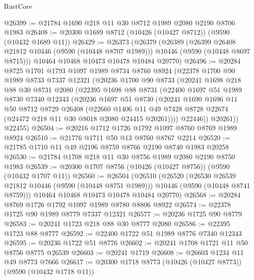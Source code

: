 \begin{lexlean}{RustCore}
\begin{coremodule}
@26399 := @21784 @1690 @218 @11 @30 @8712 @1989 @2080 @2190 @8706 @1983
@26408 := @20300 @1689 @8712 (@10426 (@10427 @8712)) (@9590 (@10432 @1689 @11))
@26429 := @26373
    (@26379
      (@26389
        (@26399 @26408 @21812 @10446 (@9590 (@10448 @8707 @1989)))
        @10446
        (@9590 (@10448 @8697 @8715)))
      @10464
      @10468
      @10473
      @10478
      @10484
      @20770)
@26496 := @20284
    @8725
    @1701
    @1793
    @1097
    @1989
    @8734
    @8760
    @8924
    (@22378
      @1700
      @90
      @1989
      @8733
      @7337
      @12321
      (@20236
        @1700
        @90
        @8733
        (@20241
          @1698
          @218
          @88
          @30
          @8731
          @2080
          (@22395
            @1698
            @88
            @8731
            (@22400
              @1697
              @51
              @1989
              @8730
              @7340
              @12343
              (@20236
                @1697
                @51
                @8730
                (@20241
                  @1690
                  @1696
                  @11
                  @50
                  @8712
                  @8729
                  @26408
                  (@22660
                    @1406
                    @11
                    @49
                    @7428
                    @8728
                    @22674
                    (@24472 @218 @11 @30 @8018 @2080 @24415 @20261))))
              @22446))
          @20261))
      @22455)
@26504 := @20216 @1712 @1726 @1792 @1097 @8760 @8769 @1989 @8924
@26510 := @21776 @1711 @50 @13 @8760 @8767 @2214
@26520 := @21785 @1710 @11 @49 @2196 @8759 @8766 @2190 @8740 @1983 @20258
@26530 := @21784 @1708 @218 @11 @30 @8756 @1989 @2080 @2190 @8750 @1983
@26539 := @20300 @1707 @8756 (@10426 (@10427 @8756)) (@9590 (@10432 @1707 @11))
@26560 := @26504
    (@26510
      (@26520
        (@26530 @26539 @21812 @10446 (@9590 (@10448 @8751 @1989)))
        @10446
        (@9590 (@10448 @8741 @8759)))
      @10464
      @10468
      @10473
      @10478
      @10484
      @20770)
@26568 := @20284 @8769 @1726 @1792 @1097 @1989 @8780 @8806 @8922
@26574 := @22378 @1725 @90 @1989 @8779 @7337 @12321
@26577 := @20236 @1725 @90 @8779
@26583 := @20241 @1723 @218 @88 @30 @8777 @2080
@26586 := @22395 @1723 @88 @8777
@26592 := @22400 @1722 @51 @1989 @8776 @7340 @12343
@26595 := @20236 @1722 @51 @8776
@26602 := @20241 @1708 @1721 @11 @50 @8756 @8775 @26539
@26603 := @20241 @1719
@26608 := @26603 @1234 @11 @49 @8773 @7666
@26617 := @20300 @1718 @8773 (@10426 (@10427 @8773)) (@9590 (@10432 @1718 @11))

\end{coremodule}
\end{lexlean}
